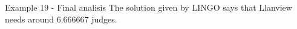 \begin{frame}{Example 19 - Final analisis}
The solution given by LINGO says that Llanview needs around 6.666667 judges.
\end{frame}
